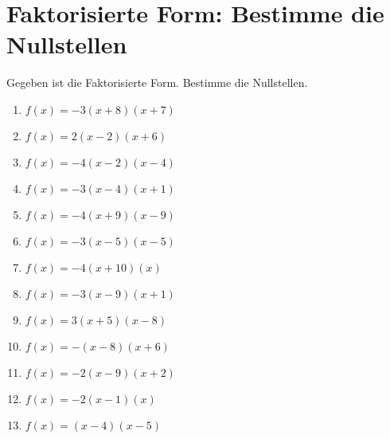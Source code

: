 \documentclass{article}%
\begin{document}
\section{Faktorisierte Form: Bestimme die Nullstellen}%
\label{sec:FaktorisierteFormBestimmedieNullstellen}%
Gegeben ist die Faktorisierte Form. Bestimme die Nullstellen.%
\begin{enumerate}[label=\alph*)]%
\item%
\newline\vspace{0.5cm} $f(x)=-3(x+8)(x+7)$%
\item%
\newline\vspace{0.5cm} $f(x)=2(x-2)(x+6)$%
\item%
\newline\vspace{0.5cm} $f(x)=-4(x-2)(x-4)$%
\item%
\newline\vspace{0.5cm} $f(x)=-3(x-4)(x+1)$%
\item%
\newline\vspace{0.5cm} $f(x)=-4(x+9)(x-9)$%
\item%
\newline\vspace{0.5cm} $f(x)=-3(x-5)(x-5)$%
\item%
\newline\vspace{0.5cm} $f(x)=-4(x+10)(x)$%
\item%
\newline\vspace{0.5cm} $f(x)=-3(x-9)(x+1)$%
\item%
\newline\vspace{0.5cm} $f(x)=3(x+5)(x-8)$%
\item%
\newline\vspace{0.5cm} $f(x)=-(x-8)(x+6)$%
\item%
\newline\vspace{0.5cm} $f(x)=-2(x-9)(x+2)$%
\item%
\newline\vspace{0.5cm} $f(x)=-2(x-1)(x)$%
\item%
\newline\vspace{0.5cm} $f(x)=(x-4)(x-5)$%

\end{enumerate}
\end{document}
